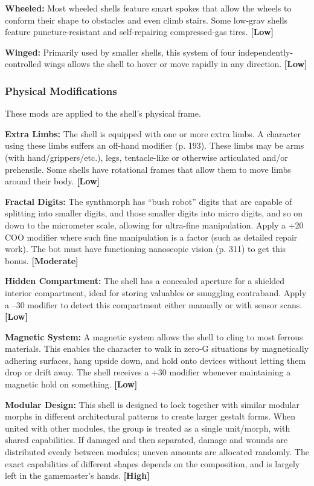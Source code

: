 \textbf{Wheeled:} Most wheeled shells feature smart 
spokes that allow the wheels to conform their shape 
to obstacles and even climb stairs. Some low-grav 
shells feature puncture-resistant and self-repairing 
compressed-gas tires. \textbf{[Low]}

\textbf{Winged:} Primarily used by smaller shells, this system 
of four independently-controlled wings allows the 
shell to hover or move rapidly in any direction. \textbf{[Low]}

\subsubsection{Physical Modifications}

These mods are applied to the shell's physical frame.

\textbf{Extra Limbs:} The shell is equipped with one or 
more extra limbs. A character using these limbs 
suffers an off-hand modifier (p. 193). These limbs 
may be arms (with hand/grippers/etc.), legs, tentacle-like
or otherwise articulated and/or prehensile. Some
shells have rotational frames that allow them to move 
limbs around their body. \textbf{[Low]}

\textbf{Fractal Digits:} The synthmorph has ``bush robot'' 
digits that are capable of splitting into smaller digits, 
and those smaller digits into micro digits, and so on 
down to the micrometer scale, allowing for ultra-fine 
manipulation. Apply a +20 COO modifier where such 
fine manipulation is a factor (such as detailed repair 
work). The bot must have functioning nanoscopic 
vision (p. 311) to get this bonus. \textbf{[Moderate]}

\textbf{Hidden Compartment:} The shell has a concealed 
aperture for a shielded interior compartment, ideal for 
storing valuables or smuggling contraband. Apply a 
–30 modifier to detect this compartment either manually
or with sensor scans. \textbf{[Low]}

\textbf{Magnetic System:} A magnetic system allows the 
shell to cling to most ferrous materials. This enables 
the character to walk in zero-G situations by magnetically
adhering surfaces, hang upside down, and hold
onto devices without letting them drop or drift away. 
The shell receives a +30 modifier whenever maintaining
a magnetic hold on something. \textbf{[Low]}

\textbf{Modular Design:} This shell is designed to lock together
with similar modular morphs in different architectural
patterns to create larger gestalt forms. When
united with other modules, the group is treated as a 
single unit/morph, with shared capabilities. If damaged
and then separated, damage and wounds are distributed
evenly between modules; uneven amounts are
allocated randomly. The exact capabilities of different 
shapes depends on the composition, and is largely left 
in the gamemaster's hands. \textbf{[High]}

